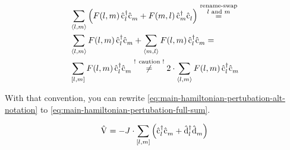 \begin{equation}
    \label{eq:fullneigborsum}
    \begin{split}
        &\neighborsum[]{l}{m} \left( F(l,m)\, \cop[]{l}{\dagger}\cop[]{m}{} + F(m,l)\, \cop[]{m}{\dagger}\cop[]{l}{} \right) \stackrel{\stackrel{\text{\scriptsize rename-swap}}{\text{$l$ and $m$}}}{=} \\
        &\neighborsum[]{l}{m} F(l,m)\, \cop[]{l}{\dagger}\cop[]{m}{} + \neighborsum[]{m}{l} F(l,m)\, \cop[]{l}{\dagger}\cop[]{m}{} = \\
        &\fullneighborsum[]{l}{m} F(l,m)\, \cop[]{l}{\dagger}\cop[]{m}{} \stackrel{\text{! caution !}}{\neq}
        2 \cdot \neighborsum[]{l}{m} F(l,m)\, \cop[]{l}{\dagger}\cop[]{m}{}
    \end{split}
\end{equation}

With that convention, you can rewrite \autoref{eq:main-hamiltonian-pertubation-alt-notation} to \autoref{eq:main-hamiltonian-pertubation-full-sum}.

\begin{equation}
    \label{eq:main-hamiltonian-pertubation-full-sum}
    \begin{split}
        \Vhamiltonian =  - J \cdot \fullneighborsum{l}{m} \left(\cop[]{l}{\dagger}\cop[]{m}{} + \dop[]{l}{\dagger}\dop[]{m}{} \right)
    \end{split}
\end{equation}
